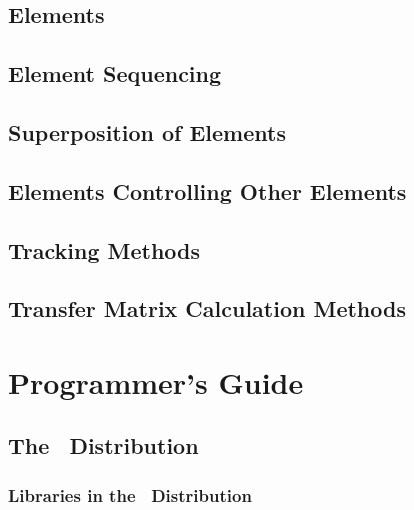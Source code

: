 \documentclass{book}
\begin{document}
\chapter{Elements}

\chapter{Element Sequencing}

\chapter{Superposition of Elements}

\chapter{Elements Controlling Other Elements}

\chapter{Tracking Methods}

\chapter{Transfer Matrix Calculation Methods}

\part{Programmer's Guide}

\chapter{The \bmad\ Distribution}

\section{Libraries in the \bmad\ Distribution}
\end{document}
